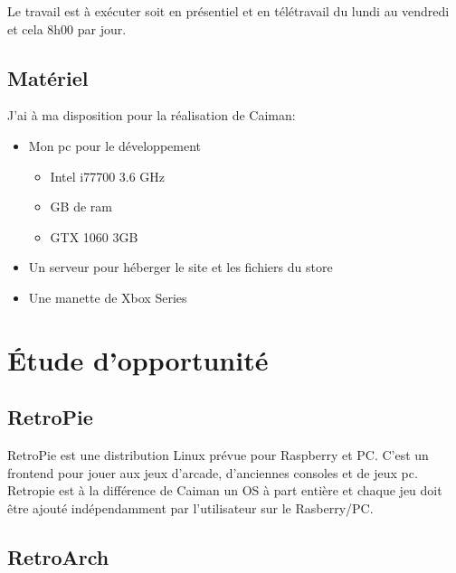 \documentclass[a4paper,12pt,french]{sphinxmanual}
\begin{document}
\sphinxAtStartPar
Le travail est à exécuter soit en présentiel et en télétravail du lundi au vendredi et cela 8h00 par jour.


\section{Matériel}
\label{\detokenize{cdc:materiel}}
\sphinxAtStartPar
J’ai à ma disposition pour la réalisation de Caiman:
\begin{itemize}
\item {} 
\sphinxAtStartPar
Mon pc pour le développement
\begin{itemize}
\item {} 
\sphinxAtStartPar
Intel i7\sphinxhyphen{}7700 3.6 GHz

\item {} 
 GB de ram

\item {} 
\sphinxAtStartPar
GTX 1060 3GB

\end{itemize}

\item {} 
\sphinxAtStartPar
Un serveur pour héberger le site et les fichiers du store

\item {} 
\sphinxAtStartPar
Une manette de Xbox Series

\end{itemize}


\chapter{Étude d’opportunité}
\label{\detokenize{opportunite:etude-dopportunite}}\label{\detokenize{opportunite::doc}}

\section{RetroPie}
\label{\detokenize{opportunite:retropie}}
\sphinxAtStartPar
{}

\sphinxAtStartPar
RetroPie est une distribution Linux prévue pour Raspberry et PC. C’est un frontend pour jouer aux jeux d’arcade, d’anciennes consoles et de jeux pc. Retropie est à la différence de Caiman un OS à part entière et chaque jeu doit être ajouté indépendamment par l’utilisateur sur le Rasberry/PC.


\section{RetroArch}
\label{\detokenize{opportunite:retroarch}}
\sphinxAtStartPar
{}
\end{document}

